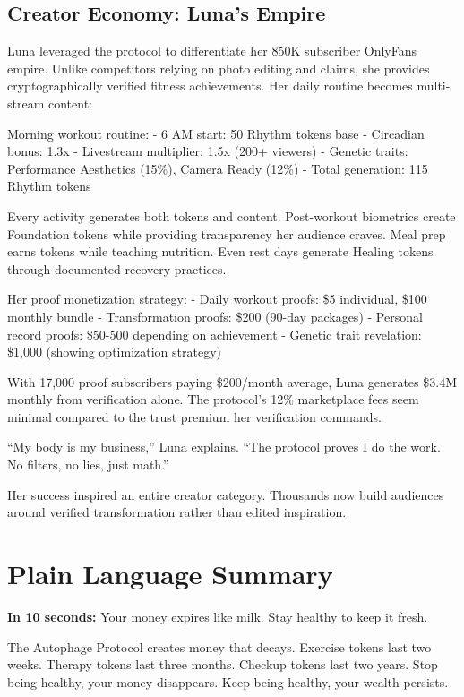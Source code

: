 \documentclass[11pt,letterpaper]{article}
\begin{document}
\subsection{Creator Economy: Luna's Empire}

Luna leveraged the protocol to differentiate her 850K subscriber OnlyFans empire. Unlike competitors relying on photo editing and claims, she provides cryptographically verified fitness achievements. Her daily routine becomes multi-stream content:

Morning workout routine:
- 6 AM start: 50 Rhythm tokens base
- Circadian bonus: 1.3x
- Livestream multiplier: 1.5x (200+ viewers)
- Genetic traits: Performance Aesthetics (15\%), Camera Ready (12\%)
- Total generation: 115 Rhythm tokens

Every activity generates both tokens and content. Post-workout biometrics create Foundation tokens while providing transparency her audience craves. Meal prep earns tokens while teaching nutrition. Even rest days generate Healing tokens through documented recovery practices.

Her proof monetization strategy:
- Daily workout proofs: \$5 individual, \$100 monthly bundle
- Transformation proofs: \$200 (90-day packages)
- Personal record proofs: \$50-500 depending on achievement
- Genetic trait revelation: \$1,000 (showing optimization strategy)

With 17,000 proof subscribers paying \$200/month average, Luna generates \$3.4M monthly from verification alone. The protocol's 12\% marketplace fees seem minimal compared to the trust premium her verification commands.

``My body is my business,'' Luna explains. ``The protocol proves I do the work. No filters, no lies, just math.''

Her success inspired an entire creator category. Thousands now build audiences around verified transformation rather than edited inspiration.

\section{Plain Language Summary}

\textbf{In 10 seconds:} Your money expires like milk. Stay healthy to keep it fresh.

The Autophage Protocol creates money that decays. Exercise tokens last two weeks. Therapy tokens last three months. Checkup tokens last two years. Stop being healthy, your money disappears. Keep being healthy, your wealth persists.
\end{document}
